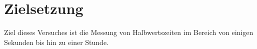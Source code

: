 \setcounter{page}{1}
\section{Zielsetzung}
\label{sec:Ziel}
Ziel dieses Versuches ist die Messung von Halbwertszeiten im Bereich von einigen
Sekunden bis hin zu einer Stunde.

